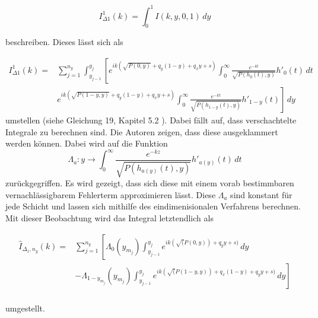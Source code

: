 \begin{equation}
    I_{\Delta1}^1(k) = \int_{0}^{1} I(k,y,0,1) \,dy 
\end{equation}

beschreiben. Dieses lässt sich als

\begin{equation}
    \begin{aligned}
    I_{\Delta1}^1(k) =&  \sum_{j = 1}^{n_y}  \int_{y_{j-1}}^{y_j} \left[ e^{ik(\sqrt{P(0,y)}+q_y(1-y)+q_xy+s)} \int_{0}^{\infty} \frac{e^{-kt}}{\sqrt{P(h_0(t),y)}}h'_0(t) \,dt  \right. \\
    & \left. e^{ik(\sqrt{P(1-y,y)}+q_y(1-y)+q_xy+s)} \int_{0}^{\infty} \frac{e^{-kt}}{\sqrt{P(h_{1-y}(t),y)}}h'_{1-y}(t) \right] \,dy  
    \end{aligned}
\end{equation}
umstellen (siehe Gleichung 19, Kapitel 5.2 \cite{gasperini:hal-03209144}). Dabei fällt auf, dass verschachtelte Integrale zu berechnen sind. Die Autoren zeigen, dass diese ausgeklammert werden können.
Dabei wird auf die Funktion 
\begin{equation}
  \Lambda_a : y \rightarrow \int_{0}^{\infty} \frac{e^{-kz}}{\sqrt{P(h_{a(y)}(t),y)}} h'_{a(y)}(t) \,dt 
\end{equation}
zurückgegriffen. Es wird gezeigt, dass sich diese mit einem vorab bestimmbaren vernachlässigbarem Fehlerterm approximieren lässt. Diese $\Lambda_a$ sind konstant für jede Schicht und lassen sich mithilfe des eindimenisionalen Verfahrens berechnen.
Mit dieser Beobachtung wird das Integral letztendlich als

\begin{equation}
    \begin{aligned}
        \hat{I}_{\Delta_1,n_y}(k) = & \sum_{j = 1}^{n_y} \left[ \Lambda_0(y_{m_j}) \int_{y_{j-1}}^{y_j}  e^{ik(\sqrt(P(0,y))+q_yy+s)}\,dy \right.\\
        & \left.  - \Lambda_{1-y_{m_j}}(y_{m_j}) \int_{y_{j-1}}^{y_j}  e^{ik(\sqrt(P(1-y,y))+q_x(1-y)+q_yy+s)}\,dy  \right] \\
    \end{aligned}
\end{equation}

umgestellt.


